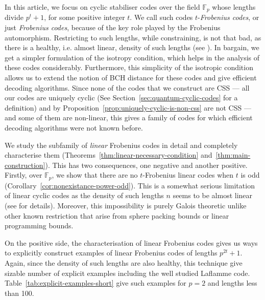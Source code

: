 \documentclass[conference]{IEEEtran}
\renewcommand{\=}{\approx}
\begin{document}
In this article, we focus on cyclic stabiliser codes over the field
$\mathbb{F}_p$ whose lengths divide $p^t+1$, for some positive integer
$t$. We call such codes $t$-\emph{Frobenius codes}, or just
\emph{Frobenius codes}, because of the key role played by the
Frobenius automorphism. Restricting to such lengths, while
constraining, is not that bad, as there is a healthy, i.e. almost
linear, density of such lengths (see \cite{dutta2011code}). In bargain, we get a
simpler formulation of the isotropy condition, which helps in the
analysis of these codes considerably. Furthermore, this simplicity of
the isotropic condition allows us to extend the notion of BCH distance
for these codes and give efficient decoding algorithms. Since none of
the codes that we construct are CSS --- all our codes are uniquely
cyclic (See Section~\ref{sec:quantum-cyclic-codes} for a definition)
and by Proposition~\ref{prop:uniquely-cyclic-is-non-css} are not CSS
--- and some of them are non-linear, this gives a family of codes for
which efficient decoding algorithms were not known before.

We study the subfamily of \emph{linear} Frobenius codes in detail and
completely characterise them
(Theorems~\ref{thm:linear-necessary-condition}
and~\ref{thm:main-construction}). This has two consequences, one
negative and another positive. Firstly, over $\mathbb{F}_p$, we show
that there are no $t$-Frobenius linear codes when $t$ is odd
(Corollary~\ref{cor:nonexistance-power-odd}). This is a somewhat
serious limitation of linear cyclic codes as the density of such
lengths $n$ seems to be almost linear (see \cite{dutta2011code} for
details). Moreover, this impossibility is purely Galois theoretic
unlike other known restriction that arise from sphere packing bounds
or linear programming bounds.

On the positive side, the characterisation of linear Frobenius codes
gives us ways to explicitly construct examples of linear Frobenius
codes of lengths $p^{2t}+1$. Again, since the density of such lengths
are also healthy, this technique give sizable number of explicit
examples including the well studied Laflamme
code. Table~\ref{tab:explicit-examples-short} give such examples for
$p=2$ and lengths less than 100.

\end{document}
